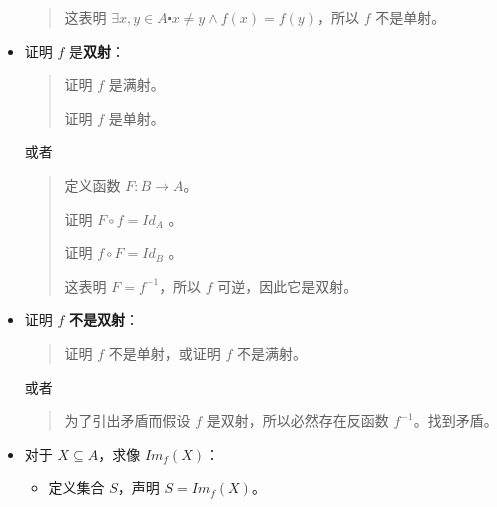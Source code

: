 \begin{itemize}
\begin{quote}
              这表明 $\exists x, y \in A \centerdot x \ne y \land f(x) = f(y)$，所以 $f$ 不是单射。
          \end{quote}
    \item 证明 $f$ 是\textbf{双射}：
          \begin{quote}
              证明 $f$ 是满射。

              证明 $f$ 是单射。
          \end{quote}
          或者
          \begin{quote}
              定义函数 $F:B \to A$。

              证明 $F \circ f = Id_A$ 。

              证明 $f \circ F = Id_B$ 。

              这表明 $F = f^{-1}$，所以 $f$ 可逆，因此它是双射。
          \end{quote}
    \item 证明 $f$ \textbf{不是双射}：
          \begin{quote}
              证明 $f$ 不是单射，或证明 $f$ 不是满射。
          \end{quote}
          或者
          \begin{quote}
              为了引出矛盾而假设 $f$ 是双射，所以必然存在反函数 $f^{-1}$。找到矛盾。
          \end{quote}
    \item 对于 $X \subseteq A$，求像 $Im_f (X)$：
          \begin{itemize}
              \item 定义集合 $S$，声明 $S = Im_f(X)$。


\end{itemize}
\end{itemize}

